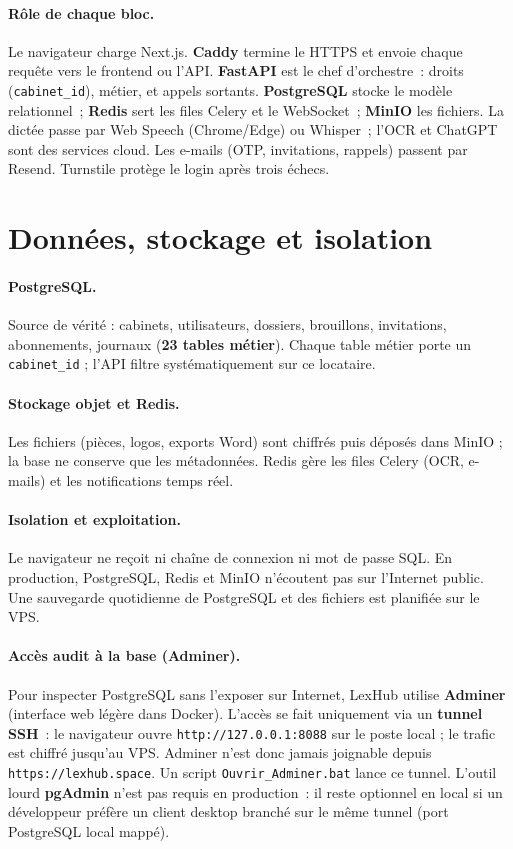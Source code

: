 \paragraph{Rôle de chaque bloc.}
Le navigateur charge Next.js. \textbf{Caddy} termine le HTTPS et envoie chaque requête vers le frontend ou l'API. \textbf{FastAPI} est le chef d'orchestre~: droits (\texttt{cabinet\_id}), métier, et appels sortants. \textbf{PostgreSQL} stocke le modèle relationnel~; \textbf{Redis} sert les files Celery et le WebSocket~; \textbf{MinIO} les fichiers. La dictée passe par Web Speech (Chrome/Edge) ou Whisper~; l'OCR et ChatGPT sont des services cloud. Les e-mails (OTP, invitations, rappels) passent par Resend. Turnstile protège le login après trois échecs.

\section{Données, stockage et isolation}
\label{sec:bdd}

\paragraph{PostgreSQL.}
Source de vérité : cabinets, utilisateurs, dossiers, brouillons, invitations, abonnements, journaux (\textbf{23 tables métier}). Chaque table métier porte un \texttt{cabinet\_id} ; l'API filtre systématiquement sur ce locataire.

\paragraph{Stockage objet et Redis.}
Les fichiers (pièces, logos, exports Word) sont chiffrés puis déposés dans MinIO ; la base ne conserve que les métadonnées. Redis gère les files Celery (OCR, e-mails) et les notifications temps réel.

\paragraph{Isolation et exploitation.}
Le navigateur ne reçoit ni chaîne de connexion ni mot de passe SQL. En production, PostgreSQL, Redis et MinIO n'écoutent pas sur l'Internet public. Une sauvegarde quotidienne de PostgreSQL et des fichiers est planifiée sur le VPS.

\paragraph{Accès audit à la base (Adminer).}
Pour inspecter PostgreSQL sans l'exposer sur Internet, LexHub utilise \textbf{Adminer} (interface web légère dans Docker). L'accès se fait uniquement via un \textbf{tunnel SSH}~: le navigateur ouvre \texttt{http://127.0.0.1:8088} sur le poste local ; le trafic est chiffré jusqu'au VPS. Adminer n'est donc jamais joignable depuis \texttt{https://lexhub.space}. Un script \texttt{Ouvrir\_Adminer.bat} lance ce tunnel. L'outil lourd \textbf{pgAdmin} n'est pas requis en production~: il reste optionnel en local si un développeur préfère un client desktop branché sur le même tunnel (port PostgreSQL local mappé).


